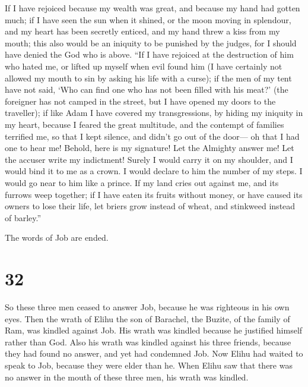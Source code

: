  If I have rejoiced because my wealth was great, and
because my hand had gotten much;  if I have seen the sun
when it shined, or the moon moving in splendour,  and my
heart has been secretly enticed, and my hand threw a kiss from my mouth;
 this also would be an iniquity to be punished by the
judges, for I should have denied the God who is above. 
``If I have rejoiced at the destruction of him who hated me, or lifted
up myself when evil found him  (I have certainly not
allowed my mouth to sin by asking his life with a curse);
 if the men of my tent have not said, `Who can find one
who has not been filled with his meat?'  (the foreigner
has not camped in the street, but I have opened my doors to the
traveller);  if like Adam I have covered my
transgressions, by hiding my iniquity in my heart, 
because I feared the great multitude, and the contempt of families
terrified me, so that I kept silence, and didn't go out of the door---
 oh that I had one to hear me! Behold, here is my
signature! Let the Almighty answer me! Let the accuser write my
indictment!  Surely I would carry it on my shoulder, and
I would bind it to me as a crown.  I would declare to him
the number of my steps. I would go near to him like a prince.
 If my land cries out against me, and its furrows weep
together;  if I have eaten its fruits without money, or
have caused its owners to lose their life,  let briers
grow instead of wheat, and stinkweed instead of barley.''

The words of Job are ended.

\hypertarget{section-31}{%
\section{32}\label{section-31}}

 So these three men ceased to answer Job, because he was
righteous in his own eyes.  Then the wrath of Elihu the
son of Barachel, the Buzite, of the family of Ram, was kindled against
Job. His wrath was kindled because he justified himself rather than God.
 Also his wrath was kindled against his three friends,
because they had found no answer, and yet had condemned Job.
 Now Elihu had waited to speak to Job, because they were
elder than he.  When Elihu saw that there was no answer in
the mouth of these three men, his wrath was kindled.

